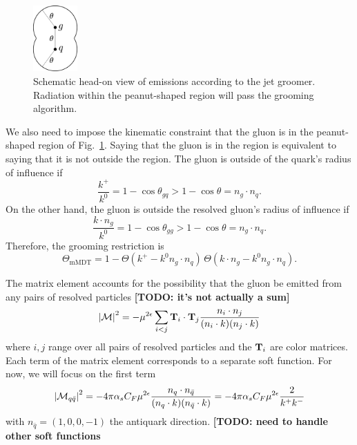 \documentclass[11pt,twoside,reqno]{amsart}
\theoremstyle{plain}
\theoremstyle{remark}
\theoremstyle{definition}
\theoremstyle{remark}
\theoremstyle{definition}
\theoremstyle{definition}
\newcommand{\cM}{\mathcal{M}}
\newcommand{\mMDT}{\mathrm{mMDT}}
\begin{document}
	\begin{figure}\label{fig:schematic}
		\includegraphics[width=0.15\textwidth]{figures/head_on_schematic.pdf}
		\caption{Schematic head-on view of emissions according to the jet groomer. Radiation within the peanut-shaped region will pass the grooming algorithm.}
	\end{figure}

	We also need to impose the kinematic constraint that the gluon is in the peanut-shaped region of Fig.~\ref{fig:schematic}. Saying that the gluon is in the region is equivalent to saying that it is not outside the region. The gluon is outside of the quark's radius of influence if
	\begin{equation}
		\frac{k^+}{k^0} = 1 - \cos\theta_{gq} > 1 - \cos\theta = n_g \cdot n_q.
	\end{equation}
	On the other hand, the gluon is outside the resolved gluon's radius of influence if
	\begin{equation}
		\frac{k \cdot n_g}{k^0} = 1 - \cos\theta_{gg} > 1 - \cos\theta = n_g \cdot n_q.
	\end{equation}
	Therefore, the grooming restriction is
	\begin{equation}
		\Theta_{\mMDT} = 1 - \Theta(k^+ - k^0 n_g \cdot n_q)\,\Theta(k \cdot n_g - k^0 n_g \cdot n_q).
	\end{equation}

	The matrix element accounts for the possibility that the gluon be emitted from any pairs of resolved particles {\color{red}\textbf{[TODO: it's not actually a sum]}} \cite{catani_infrared_2000}
	\begin{equation}\label{eq:matrix element general}
		\abs{\cM}^2 = -\mu^{2\epsilon}\sum_{i < j} \vb{T}_i \cdot \vb{T}_j \frac{n_i \cdot n_j}{(n_i \cdot k)(n_j \cdot k)}
	\end{equation}
	where $i, j$ range over all pairs of resolved particles and the $\vb{T}_i$ are color matrices. Each term of the matrix element corresponds to a separate soft function. For now, we will focus on the first term \cite{catani_infrared_2000}
	\begin{equation}
		\abs{\cM_{q\bar q}}^2 = -4\pi\alpha_s C_F \mu^{2\epsilon}\frac{n_q \cdot n_{\bar q}}{(n_q \cdot k)(n_{\bar q}\cdot k)} = -4\pi\alpha_s C_F \mu^{2\epsilon}\frac{2}{k^+ k^-}
	\end{equation}
	with $n_{\bar q} = (1, 0, 0, -1)$ the antiquark direction. {\color{red}\textbf{[TODO: need to handle other soft functions}}
\end{document}

